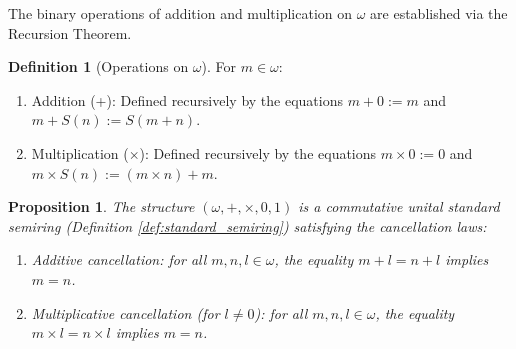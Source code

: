 \documentclass[11pt, a4paper]{article}
\theoremstyle{plain}
\newtheorem{proposition}[theorem]{Proposition}
\theoremstyle{definition}
\newtheorem{definition}[theorem]{Definition}
\numberwithin{equation}{section}
\begin{document}
The binary operations of addition and multiplication on $\omega$ are established via the Recursion Theorem.

\begin{definition}[Operations on $\omega$]\label{def:operations_omega}
For $m \in \omega$:
\begin{enumerate}
    \item Addition (+): Defined recursively by the equations $m+0 := m$ and $m+S(n) := S(m+n)$.
    \item Multiplication ($\times$): Defined recursively by the equations $m\times 0 := 0$ and $m\times S(n) := (m\times n) + m$.
\end{enumerate}
\end{definition}

\begin{proposition}\label{prop:properties_omega}
The structure $(\omega, +, \times, 0, 1)$ is a commutative unital standard semiring (Definition \ref{def:standard_semiring}) satisfying the cancellation laws:
\begin{enumerate}
    \item Additive cancellation: for all $m, n, l \in \omega$, the equality $m+l = n+l$ implies $m=n$.
    \item Multiplicative cancellation (for $l\neq 0$): for all $m, n, l \in \omega$, the equality $m\times l = n\times l$ implies $m=n$.
\end{enumerate}
\end{proposition}
\end{document}
